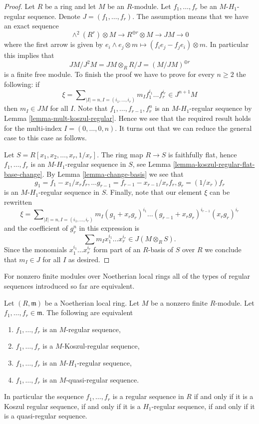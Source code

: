 \begin{proof}
Let $R$ be a ring and let $M$ be an $R$-module.
Let $f_1, \ldots, f_r$ be an $M$-$H_1$-regular sequence.
Denote $J = (f_1, \ldots, f_r)$. The assumption means that we have
an exact sequence
$$
\wedge^2(R^r) \otimes M \to R^{\oplus r} \otimes M \to JM \to 0
$$
where the first arrow is given by
$e_i \wedge e_j \otimes m \mapsto (f_ie_j - f_je_i) \otimes m$.
In particular this implies that
$$
JM/J^2M = JM \otimes_R R/J = (M/JM)^{\oplus r}
$$
is a finite free module. To finish the proof we have to prove
for every $n \geq 2$ the following: if
$$
\xi = \sum\nolimits_{|I| = n, I = (i_1, \ldots, i_r)}
m_I f_1^{i_1} \ldots f_r^{i_r} \in J^{n + 1}M
$$
then $m_I \in JM$ for all $I$. Note that $f_1, \ldots, f_{r - 1}, f_r^n$
is an $M$-$H_1$-regular sequence by
Lemma \ref{lemma-mult-koszul-regular}.
Hence we see that the required result holds for
the multi-index $I = (0, \ldots, 0, n)$. It turns out that we can
reduce the general case to this case as follows.

\medskip\noindent
Let $S = R[x_1, x_2, \ldots, x_r, 1/x_r]$. The ring map $R \to S$ is faithfully
flat, hence $f_1, \ldots, f_r$ is an $M$-$H_1$-regular sequence in $S$, see
Lemma \ref{lemma-koszul-regular-flat-base-change}.
By
Lemma \ref{lemma-change-basis}
we see that
$$
g_1 = f_1 - x_1/x_r f_r, \ldots
g_{r - 1} = f_{r - 1} - x_{r - 1}/x_r f_r,
g_r = (1/x_r)f_r
$$
is an $M$-$H_1$-regular sequence in $S$. Finally, note that our element
$\xi$ can be rewritten
$$
\xi = \sum\nolimits_{|I| = n, I = (i_1, \ldots, i_r)}
m_I (g_1 + x_r g_r)^{i_1} \ldots (g_{r - 1} + x_r g_r)^{i_{r - 1}}
(x_rg_r)^{i_r}
$$
and the coefficient of $g_r^n$ in this expression is
$$
\sum m_I x_1^{i_1} \ldots x_r^{i_r} \in J(M \otimes_R S).
$$
Since the monomials $x_1^{i_1} \ldots x_r^{i_r}$ form part of an $R$-basis
of $S$ over $R$ we conclude that $m_I \in J$ for all $I$ as desired.
\end{proof}

\noindent
For nonzero finite modules over Noetherian local rings all of the types of
regular sequences introduced so far are equivalent.

\begin{lemma}
\label{lemma-noetherian-finite-all-equivalent}
Let $(R, \mathfrak m)$ be a Noetherian local ring. Let $M$ be a nonzero
finite $R$-module. Let $f_1, \ldots, f_r \in \mathfrak m$. The following
are equivalent
\begin{enumerate}
\item $f_1, \ldots, f_r$ is an $M$-regular sequence,
\item $f_1, \ldots, f_r$ is a $M$-Koszul-regular sequence,
\item $f_1, \ldots, f_r$ is an $M$-$H_1$-regular sequence,
\item $f_1, \ldots, f_r$ is an $M$-quasi-regular sequence.
\end{enumerate}
In particular the sequence $f_1, \ldots, f_r$ is a regular sequence
in $R$ if and only if it is a Koszul regular sequence, if and only if
it is a $H_1$-regular sequence, if and only if it is a quasi-regular sequence.
\end{lemma}


